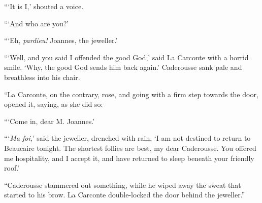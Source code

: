 “‘It is I,’ shouted a voice.

“‘And who are you?’

“‘Eh, \textit{pardieu!} Joannes, the jeweller.’

“‘Well, and you said I offended the good God,’ said La Carconte with a
horrid smile. ‘Why, the good God sends him back again.’ Caderousse sank
pale and breathless into his chair.

“La Carconte, on the contrary, rose, and going with a firm step towards
the door, opened it, saying, as she did so:

“‘Come in, dear M. Joannes.’

“‘\textit{Ma foi},’ said the jeweller, drenched with rain, ‘I am not destined
to return to Beaucaire tonight. The shortest follies are best, my dear
Caderousse. You offered me hospitality, and I accept it, and have
returned to sleep beneath your friendly roof.’

“Caderousse stammered out something, while he wiped away the sweat that
started to his brow. La Carconte double-locked the door behind the
jeweller.”
